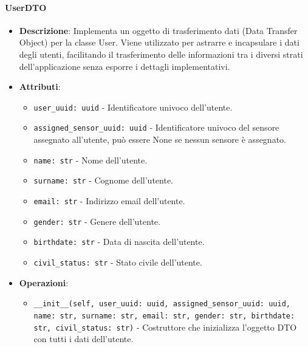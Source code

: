\documentclass[10pt]{article}
\begin{document}
    \paragraph{UserDTO}
    \begin{itemize} 
    \item \textbf{Descrizione}: Implementa un oggetto di trasferimento dati (Data Transfer Object) per la classe User. Viene utilizzato per astrarre e incapsulare i dati degli utenti, facilitando il trasferimento delle informazioni tra i diversi strati dell'applicazione senza esporre i dettagli implementativi.
    \item \textbf{Attributi}:
    \begin{itemize}
        \item \texttt{user\_uuid: uuid} - Identificatore univoco dell'utente.
        \item \texttt{assigned\_sensor\_uuid: uuid} - Identificatore univoco del sensore assegnato all'utente, può essere None se nessun sensore è assegnato.
        \item \texttt{name: str} - Nome dell'utente.
        \item \texttt{surname: str} - Cognome dell'utente.
        \item \texttt{email: str} - Indirizzo email dell'utente.
        \item \texttt{gender: str} - Genere dell'utente.
        \item \texttt{birthdate: str} - Data di nascita dell'utente.
        \item \texttt{civil\_status: str} - Stato civile dell'utente.
    \end{itemize}
    
    \item \textbf{Operazioni}:
    \begin{itemize}
        \item \texttt{\_\_init\_\_(self, user\_uuid: uuid, assigned\_sensor\_uuid: uuid, name: str, surname: str, email: str, gender: str, birthdate: str, civil\_status: str)} - Costruttore che inizializza l'oggetto DTO con tutti i dati dell'utente.
    \end{itemize}
    \end{itemize}
\end{document}
